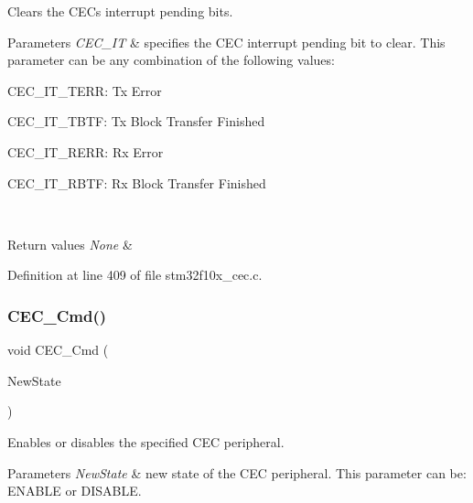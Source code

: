 Clears the C\+EC\textquotesingle{}s interrupt pending bits. 


\begin{DoxyParams}{Parameters}
{\em C\+E\+C\+\_\+\+IT} & specifies the C\+EC interrupt pending bit to clear. This parameter can be any combination of the following values\+: \begin{DoxyItemize}
\item C\+E\+C\+\_\+\+I\+T\+\_\+\+T\+E\+RR\+: Tx Error \item C\+E\+C\+\_\+\+I\+T\+\_\+\+T\+B\+TF\+: Tx Block Transfer Finished \item C\+E\+C\+\_\+\+I\+T\+\_\+\+R\+E\+RR\+: Rx Error \item C\+E\+C\+\_\+\+I\+T\+\_\+\+R\+B\+TF\+: Rx Block Transfer Finished \end{DoxyItemize}
\\
\hline
\end{DoxyParams}

\begin{DoxyRetVals}{Return values}
{\em None} & \\
\hline
\end{DoxyRetVals}


Definition at line 409 of file stm32f10x\+\_\+cec.\+c.

\mbox{\label{group___c_e_c___exported___functions_ga0c8efa79e5768930e567b3b3ed6e09e9}} 
\subsubsection{\texorpdfstring{C\+E\+C\+\_\+\+Cmd()}{CEC\_Cmd()}}
{\footnotesize\ttfamily void C\+E\+C\+\_\+\+Cmd (\begin{DoxyParamCaption}\item[{\hyperlink{group___exported__types_gac9a7e9a35d2513ec15c3b537aaa4fba1}{Functional\+State}}]{New\+State }\end{DoxyParamCaption})}



Enables or disables the specified C\+EC peripheral. 


\begin{DoxyParams}{Parameters}
{\em New\+State} & new state of the C\+EC peripheral. This parameter can be\+: E\+N\+A\+B\+LE or D\+I\+S\+A\+B\+LE. \\
\hline
\end{DoxyParams}

